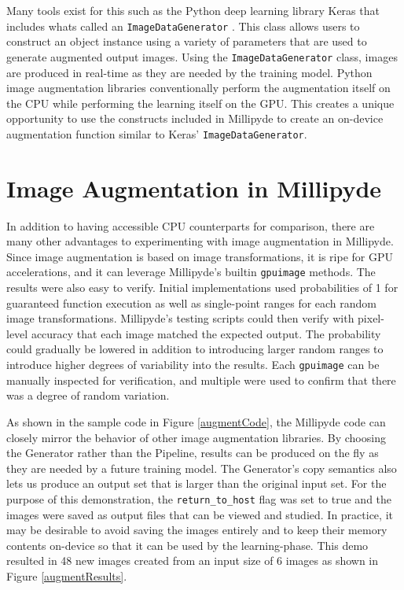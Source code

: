 \quad Many tools exist for this such as the Python deep learning library Keras that includes whats called an \verb|ImageDataGenerator| \cite{keras}. This class allows users to construct an object instance using a variety of parameters that are used to generate augmented output images. Using the \verb|ImageDataGenerator| class, images are produced in real-time as they are needed by the training model. Python image augmentation libraries conventionally perform the augmentation itself on the CPU while performing the learning itself on the GPU. This creates a unique opportunity to use the constructs included in Millipyde to create an on-device augmentation function similar to Keras' \verb|ImageDataGenerator|.

\section{Image Augmentation in Millipyde}

In addition to having accessible CPU counterparts for comparison, there are many other advantages to experimenting with image augmentation in Millipyde. Since image augmentation is based on image transformations, it is ripe for GPU accelerations, and it can leverage Millipyde's builtin \verb|gpuimage| methods. The results were also easy to verify. Initial implementations used probabilities of 1 for guaranteed function execution as well as single-point ranges for each random image transformations. Millipyde's testing scripts could then verify with pixel-level accuracy that each image matched the expected output. The probability could gradually be lowered in addition to introducing larger random ranges to introduce higher degrees of variability into the results. Each \verb|gpuimage| can be manually inspected for verification, and multiple were used to confirm that there was a degree of random variation. 

\quad As shown in the sample code in Figure \ref{augmentCode}, the Millipyde code can closely mirror the behavior of other image augmentation libraries. By choosing the Generator rather than the Pipeline, results can be produced on the fly as they are needed by a future training model. The Generator's copy semantics also lets us produce an output set that is larger than the original input set. For the purpose of this demonstration, the \verb|return_to_host| flag was set to true and the images were saved as output files that can be viewed and studied. In practice, it may be desirable to avoid saving the images entirely and to keep their memory contents on-device so that it can be used by the learning-phase. This demo resulted in 48 new images created from an input size of 6 images as shown in Figure \ref{augmentResults}. 

